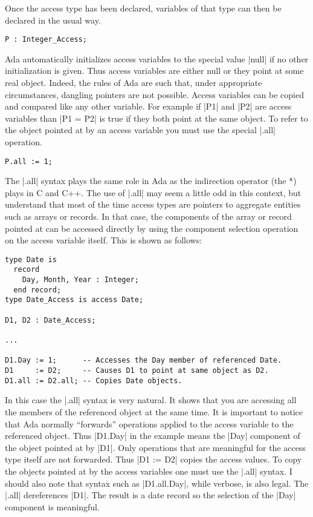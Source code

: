 Once the access type has been declared, variables of that type can then be declared in the usual
way.

\begin{lstlisting}
P : Integer_Access;
\end{lstlisting}

Ada automatically initializes access variables to the special value |null| if no other
initialization is given. Thus access variables are either null or they point at some real
object. Indeed, the rules of Ada are such that, under appropriate circumstances, dangling
pointers are not possible. Access variables can be copied and compared like any other variable.
For example if |P1| and |P2| are access variables than |P1 = P2| is true if they both point at
the same object. To refer to the object pointed at by an access variable you must use the
special |.all| operation.

\begin{lstlisting}
P.all := 1;
\end{lstlisting}

The |.all| syntax plays the same role in Ada as the indirection operator (the *) plays in C and
C++. The use of |.all| may seem a little odd in this context, but understand that most of the
time access types are pointers to aggregate entities such as arrays or records. In that case,
the components of the array or record pointed at can be accessed directly by using the component
selection operation on the access variable itself. This is shown as follows:

\begin{lstlisting}
type Date is
  record
    Day, Month, Year : Integer;
  end record;
type Date_Access is access Date;

D1, D2 : Date_Access;

...

D1.Day := 1;      -- Accesses the Day member of referenced Date.
D1     := D2;     -- Causes D1 to point at same object as D2.
D1.all := D2.all; -- Copies Date objects.
\end{lstlisting}

In this case the |.all| syntax is very natural. It shows that you are accessing all the members
of the referenced object at the same time. It is important to notice that Ada normally
``forwards'' operations applied to the access variable to the referenced object. Thus |D1.Day|
in the example means the |Day| component of the object pointed at by |D1|. Only operations that
are meaningful for the access type itself are not forwarded. Thus |D1 := D2| copies the access
values. To copy the objects pointed at by the access variables one must use the |.all| syntax. I
should also note that syntax such as |D1.all.Day|, while verbose, is also legal. The |.all|
dereferences |D1|. The result is a date record so the selection of the |Day| component is
meaningful.

